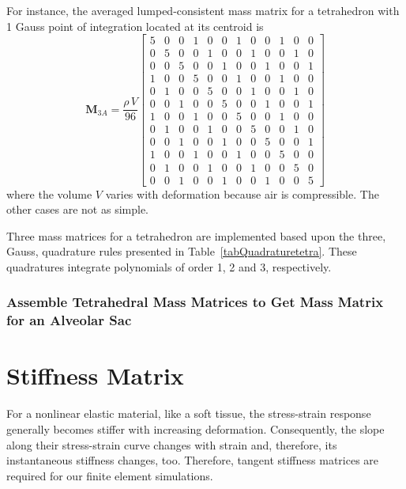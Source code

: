 For instance, the averaged lumped-consistent mass matrix for a tetrahedron with 1 Gauss point of integration located at its centroid is
\begin{equation}
\mathbf{M}_{3A} = \frac{\rho \, V}{96} \begin{bmatrix}
5 & 0 & 0 & 1 & 0 & 0 & 1 & 0 & 0 & 1 & 0 & 0 \\
0 & 5 & 0 & 0 & 1 & 0 & 0 & 1 & 0 & 0 & 1 & 0 \\
0 & 0 & 5 & 0 & 0 & 1 & 0 & 0 & 1 & 0 & 0 & 1 \\
1 & 0 & 0 & 5 & 0 & 0 & 1 & 0 & 0 & 1 & 0 & 0 \\
0 & 1 & 0 & 0 & 5 & 0 & 0 & 1 & 0 & 0 & 1 & 0 \\
0 & 0 & 1 & 0 & 0 & 5 & 0 & 0 & 1 & 0 & 0 & 1 \\
1 & 0 & 0 & 1 & 0 & 0 & 5 & 0 & 0 & 1 & 0 & 0 \\
0 & 1 & 0 & 0 & 1 & 0 & 0 & 5 & 0 & 0 & 1 & 0 \\
0 & 0 & 1 & 0 & 0 & 1 & 0 & 0 & 5 & 0 & 0 & 1 \\
1 & 0 & 0 & 1 & 0 & 0 & 1 & 0 & 0 & 5 & 0 & 0 \\
0 & 1 & 0 & 0 & 1 & 0 & 0 & 1 & 0 & 0 & 5 & 0 \\
0 & 0 & 1 & 0 & 0 & 1 & 0 & 0 & 1 & 0 & 0 & 5 
\end{bmatrix}
\end{equation}
where the volume $V$ varies with deformation because air is compressible.  The other cases are not as simple.

Three mass matrices for a tetrahedron are implemented based upon the three, Gauss, quadrature rules presented in Table~\ref{tabQuadraturetetra}.  These quadratures integrate polynomials of order 1, 2 and 3, respectively. 

\subsubsection{Assemble Tetrahedral Mass Matrices to Get Mass Matrix for an Alveolar Sac}


\section{Stiffness Matrix}
\label{secStiffnessMatrices}

For a nonlinear elastic material, like a soft tissue, the stress-strain response generally becomes stiffer with increasing deformation.  Consequently, the slope along their stress-strain curve changes with strain and, therefore, its instantaneous stiffness changes, too.  Therefore, tangent stiffness matrices are required for our finite element simulations. 

